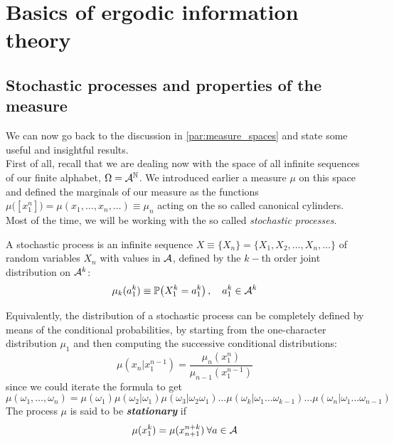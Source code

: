 \chapter{Basics of ergodic information theory}

\section{Stochastic processes and properties of the measure}
We can now go back to the discussion in \cref{par:measure_spaces} and state some useful and insightful results.
\\First of all, recall that we are dealing now with the space of all infinite sequences of our finite alphabet, $\Omega = \mathcal{A}^{\mathbb{N}}$. We introduced earlier a measure $\mu$ on this space and defined the marginals of our measure as the functions $\mu\big( [x_1^n] \big) = \mu(x_1 ,\dots, x_n, \dots) \equiv \mu_n$ acting on the so called canonical cylinders. Most of the time, we will be working with the so called \textit{stochastic processes}.
\begin{definition}
    A stochastic process is an infinite sequence $X \equiv \big\{ X_n \big\} = \big\{ X_1, X_2, \dots, X_n, \dots \big\}$ of random variables $X_n$ with values in $\mathcal{A}$, defined by the $k-$th order joint distribution on $\mathcal{A}^k$:
    \begin{equation*}
        \mu_k(a_1^k) \equiv \mathbb{P} \big( X_1^k = a_1^k \big) \, , \quad a_1^k \in \mathcal{A}^k
    \end{equation*}
\end{definition}
Equivalently, the distribution of a stochastic process can be completely defined by means of the conditional probabilities, by starting from the one-character distribution $\mu_1$ and then computing the successive conditional distributions:
\begin{equation}
    \mu(x_n|x_1^{n-1}) = \frac{\mu_n(x_1^n)}{\mu_{n-1}(x_1^{n-1})}
\end{equation}
since we could iterate the formula to get 
\begin{equation*}
    \mu(\omega_1, \dots, \omega_n) = \mu(\omega_1) \mu(\omega_2|\omega_1)\mu(\omega_3|\omega_2\omega_1) \dots \mu(\omega_k|\omega_1 \dots \omega_{k-1}) \dots \mu(\omega_n|\omega_1 \dots \omega_{n-1}) 
\end{equation*}
The process $\mu$ is said to be \textbf{\textit{stationary}} if 
\begin{equation}
    \mu(x_1^k) = \mu(x_{n+1}^{n+k}) \: \forall a \in \mathcal{A}
\end{equation}
